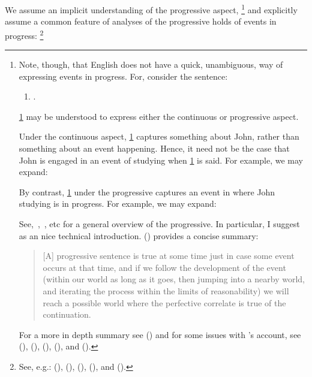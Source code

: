 \begin{note}
  \noindent%
  We assume an implicit understanding of the progressive aspect,%
  \footnote{
    \nocite{Portner:1998um}
    \nocite{Engelberg:1999vi}
    Note, though, that English does not have a quick, unambiguous, way of expressing events in progress.
    For, consider the sentence:
    \begin{enumerate}[label=\arabic*., ref=(\arabic*)]
    \item
      \label{prog:abmig}
      .
    \end{enumerate}
    \ref{prog:abmig} may be understood to express either the continuous or progressive aspect.

    Under the continuous aspect, \ref{prog:abmig} captures something about John, rather than something about an event happening.
    Hence, it need not be the case that John is engaged in an event of studying when \ref{prog:abmig} is said.
    For example, we may expand:

    By contrast, \ref{prog:abmig} under the progressive captures an event in where John studying is in progress.
    For example, we may expand:

    See,~\textcite{Richards:1981wo},~\textcite{Portner:2011vi}, etc for a general overview of the progressive.
    In particular, I suggest \textcite{Landman:1992wh} as an nice technical introduction.
    \citeauthor{Szabo:2004ul} (\citeyear[34]{Szabo:2004ul}) provides a concise summary:
    \begin{quote}
      [A] progressive sentence is true at some time just in case some event occurs at that time, and if we follow the development of the event (within our world as long as it goes, then jumping into a nearby world, and iterating the process within the limits of reasonability) we will reach a possible world where the perfective correlate is true of the continuation.
    \end{quote}
    For a more in depth summary see (\cite[764--766]{Portner:1998um}) and for some issues with \citeauthor{Landman:1992wh}'s account, see
    (\cite{Bonomi:1997uq}),
    (\cite[49--50]{Engelberg:1999vi}),
    (\cite[35]{Szabo:2004ul}),
    (\cite[767]{Portner:1998um}),
    and (\cite[1256]{Portner:2011vi}).
  }
  and explicitly assume a common feature of analyses of the progressive holds of events in progress:%
  \footnote{
    See, e.g.:
    (\cite{Bennett:1972uw}),
    (\cite{Dowty:1979vq}),
    (\cite{Parsons:1990aa}),
    (\cite{Landman:1992wh}), and
    (\cite{Portner:1998um}).

}
\end{note}
